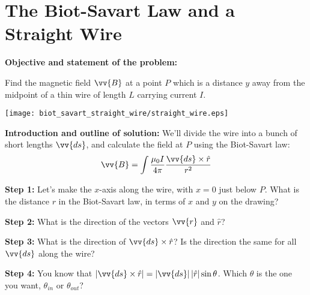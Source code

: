 \section{The Biot-Savart Law and a Straight Wire}
\label{biot_savart_straight_wire}


\makelabheader %

\vspace{0.5cm}

\textbf{Objective and statement of the problem:}

Find the magnetic field $\vv{B}$ at a point $P$ which is a distance $y$ away from the midpoint of a thin wire of length $L$ carrying current $I$.
\begin{center}
    \texttt{[image: biot\_savart\_straight\_wire/straight\_wire.eps]}
\end{center}

\textbf{Introduction and outline of solution:}
We'll divide the wire into a bunch of short lengths $\vv{ds}$, and calculate the field at $P$ using the Biot-Savart law:
\begin{displaymath}
\vv{B} = \int{\frac{\mu_0I}{4 \pi}\frac{\vv{ds}\times \hat{r}}{r^2}}
\end{displaymath}

\textbf{Step 1:} \newline
Let's make the $x$-axis along the wire, with $x=0$ just below $P$.  What is the distance $r$ in the Biot-Savart law, in terms of $x$ and $y$ on the drawing?

\vspace{.6in}


\textbf{Step 2:} \newline
What is the direction of the vectors $\vv{r}$ and $\hat{r}$?



\vspace{.6in}

\textbf{Step 3:} \newline
What is the direction of  $\vv{ds}\times \hat{r}$?  Is the direction the same for all $\vv{ds}$ along the wire? 

\vspace{.6in}


\textbf{Step 4:} \newline
You know that $\left|\vv{ds}\times \hat{r}\right|=\left|\vv{ds}\right|  \left|\hat{r}\right|\sin\theta$.  Which $\theta$ is the one you want, $\theta_{in}$ or $\theta_{out}$?

